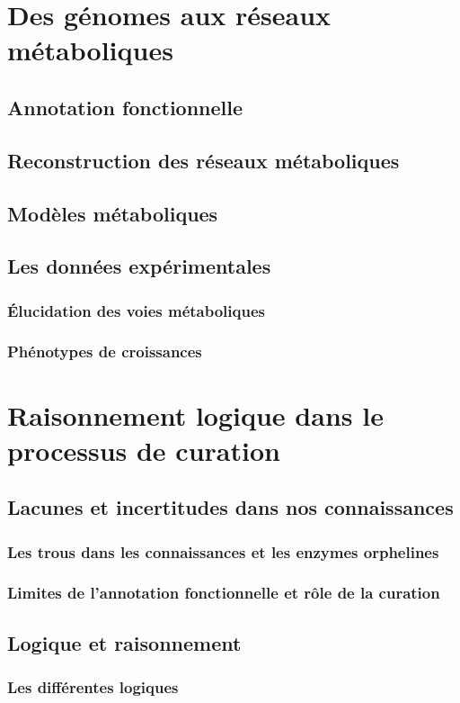 \begin{refsection}
\section{Des génomes aux réseaux métaboliques}
\subsection{Annotation fonctionnelle}
\subsection{Reconstruction des réseaux métaboliques}
\subsection{Modèles métaboliques}
\subsection{Les données expérimentales}
\subsubsection{Élucidation des voies métaboliques}
\subsubsection{Phénotypes de croissances}

\section{Raisonnement logique dans le processus de curation}
\subsection{Lacunes et incertitudes dans nos connaissances}
\subsubsection{Les trous dans les connaissances et les enzymes orphelines}
\subsubsection{Limites de l’annotation fonctionnelle et rôle de la curation}
\subsection{Logique et raisonnement}
\subsubsection{Les différentes logiques}

\end{refsection}
